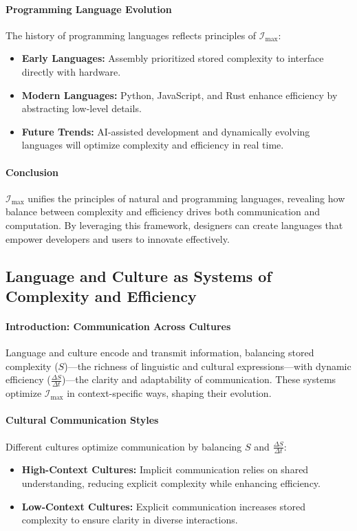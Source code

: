 \documentclass[12pt]{article}
\begin{document}
\paragraph{Programming Language Evolution}
The history of programming languages reflects principles of \(\mathcal{I}_{\text{max}}\):
\begin{itemize}
    \item \textbf{Early Languages:} Assembly prioritized stored complexity to interface directly with hardware.
    \item \textbf{Modern Languages:} Python, JavaScript, and Rust enhance efficiency by abstracting low-level details.
    \item \textbf{Future Trends:} AI-assisted development and dynamically evolving languages will optimize complexity and efficiency in real time.
\end{itemize}

\paragraph{Conclusion}
\(\mathcal{I}_{\text{max}}\) unifies the principles of natural and programming languages, revealing how balance between complexity and efficiency drives both communication and computation. By leveraging this framework, designers can create languages that empower developers and users to innovate effectively.

\subsection{Language and Culture as Systems of Complexity and Efficiency}

\paragraph{Introduction: Communication Across Cultures}
Language and culture encode and transmit information, balancing stored complexity (\(S\))—the richness of linguistic and cultural expressions—with dynamic efficiency (\(\frac{\Delta S}{\Delta t}\))—the clarity and adaptability of communication. These systems optimize \(\mathcal{I}_{\text{max}}\) in context-specific ways, shaping their evolution.

\paragraph{Cultural Communication Styles}
Different cultures optimize communication by balancing \(S\) and \(\frac{\Delta S}{\Delta t}\):
\begin{itemize}
    \item \textbf{High-Context Cultures:} Implicit communication relies on shared understanding, reducing explicit complexity while enhancing efficiency.
    \item \textbf{Low-Context Cultures:} Explicit communication increases stored complexity to ensure clarity in diverse interactions.
\end{itemize}
\end{document}
